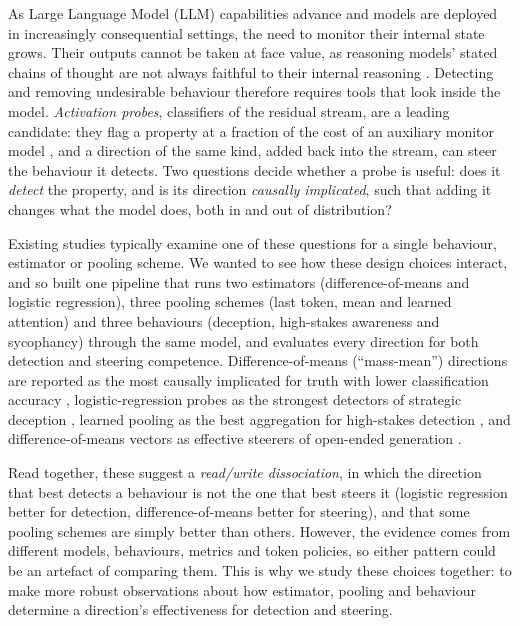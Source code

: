\documentclass[conference]{IEEEtran}
\begin{document}
As Large Language Model (LLM) capabilities advance and models are deployed in increasingly
consequential settings, the need to monitor their internal state grows.
Their outputs cannot be taken at face value, as reasoning models' stated
chains of thought are not always faithful to their internal reasoning
\citep{chen2025}. Detecting and removing undesirable behaviour therefore requires tools that look inside the model.
\emph{Activation probes}, classifiers of the residual stream, are a
leading candidate: they flag a property at a fraction of the cost of an
auxiliary monitor model \citep{alain2018,mckenzie2025}, and a direction of
the same kind, added back into the stream, can steer the behaviour it
detects. Two questions decide whether a probe is useful: does it
\emph{detect} the property, and is its
direction \emph{causally implicated}, such that adding it changes what the
model does, both in and out of distribution?

Existing studies typically examine one of these questions for a single behaviour, estimator or pooling scheme. We
wanted to see how these design choices interact, and so built one pipeline
that runs two estimators (difference-of-means and logistic regression),
three pooling schemes (last token, mean and learned attention) and three
behaviours (deception, high-stakes awareness and sycophancy) through the
same model, and evaluates every direction for both detection and steering competence.
Difference-of-means (``mass-mean'')
directions are reported as the most causally implicated for truth with lower 
classification accuracy \citep{marks2024}, logistic-regression
probes as the strongest detectors of strategic deception
\citep{goldowsky2025}, learned pooling as the best aggregation for
high-stakes detection \citep{mckenzie2025}, and difference-of-means vectors as
effective steerers of open-ended generation \citep{rimsky2024}.

Read together, these suggest a \emph{read/write dissociation}, in which
the direction that best detects a behaviour is not the one that best steers
it (logistic regression better for detection, difference-of-means better
for steering), and that some pooling schemes are simply better than
others. However, the evidence comes from different models, behaviours,
metrics and token policies, so either pattern could be an artefact of
comparing them. This is why we study these choices together: to make more robust observations about how estimator, pooling and behaviour determine a direction's effectiveness for detection and steering.
\end{document}
